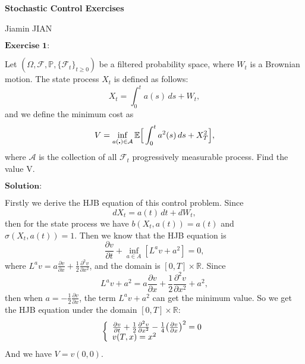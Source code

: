 \documentclass[12pt,a4paper]{ctexart}
\begin{document}
\begin{center}
\textbf{Stochastic Control Exercises}
\vspace{8pt}

Jiamin JIAN
\end{center}

\vspace{12pt}

$\textbf{Exercise 1:}$

Let $(\Omega, \mathcal{F}, \mathbb{P}, \{ \mathcal{F}_{t}\}_{t \geq 0})$ be a filtered probability space, where $W_{t}$ is a Brownian motion. The state process $X_{t}$ is defined as follows:
\begin{equation*}
    X_{t} = \int_{0}^{t} a(s) \, d s + W_{t},
\end{equation*}
and we define the minimum cost as
\begin{equation*}
    V = \inf_{a(\centerdot) \in \mathcal{A}} \mathbb{E} \Big{[} \int_{0}^{t} a^{2} (s) \, d s + X_{T}^{2} \Big{]},
\end{equation*}
where $\mathcal{A}$ is the collection of all $\mathcal{F}_{t}$ progressively measurable process. Find the value V. 


\vspace{8pt}

$\textbf{Solution:}$

Firstly we derive the HJB equation of this control problem. Since
\begin{equation*}
    d X_{t} = a(t) \, d t + d W_{t},
\end{equation*}
then for the state process we have $b(X_{t}, a(t)) = a(t)$ and $\sigma(X_{t}, a(t)) = 1$. Then we know that the HJB equation is
\begin{equation*}
    \frac{\partial v}{\partial t} + \inf_{a \in A} [L^{a}v + a^{2}] = 0,
\end{equation*}
where $L^{a}v = a  \frac{\partial v}{\partial x} + \frac{1}{2} \frac{\partial^{2} v}{\partial x^{2}}$, and the domain is $[0, T] \times \mathbb{R}$. Since 
\begin{equation*}
    L^{a}v + a^{2} = a  \frac{\partial v}{\partial x} + \frac{1}{2} \frac{\partial^{2} v}{\partial x^{2}} + a^{2},
\end{equation*}
then when $a = - \frac{1}{2} \frac{\partial v}{\partial x}$, the term $L^{a} v + a^{2}$ can get the minimum value. So we get the HJB equation under the domain $[0, T] \times \mathbb{R}$:
\begin{equation*}
\left\{
             \begin{array}{l}
             \frac{\partial v}{\partial t} + \frac{1}{2} \frac{\partial^{2} v}{\partial x^{2}} - \frac{1}{4} \big{(} \frac{\partial v}{\partial x}\big{)}^{2} = 0 \\
             v(T, x) = x^{2}
             \end{array}
\right.
\end{equation*}
And we have $V = v(0, 0)$. 
\end{document}
